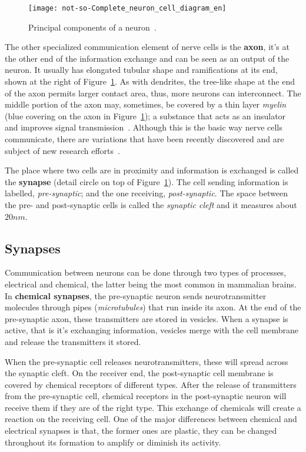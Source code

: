 \begin{figure}
  \begin{center}
    \texttt{[image: not-so-Complete\_neuron\_cell\_diagram\_en]}
    \caption{Principal components of a neuron~\cite{wikipedia-images}.}
    \label{fig:neuro:neuron-anatomy}
  \end{center}
\end{figure}

The other specialized communication element of nerve cells is the \textbf{axon}, it's at the other end of the information exchange and can be seen as an output of the neuron. It usually has elongated tubular shape and ramifications at its end, shown at the right of Figure~\ref{fig:neuro:neuron-anatomy}. As with dendrites, the tree-like shape at the end of the axon permits larger contact area, thus, more neurons can interconnect. The middle portion of the axon may, sometimes, be covered by a thin layer \emph{myelin} (blue covering on the axon in Figure~\ref{fig:neuro:neuron-anatomy}); a substance that acts as an insulator and improves signal transmission~\cite{thompson2000brain}. Although this is the basic way nerve cells communicate, there are variations that have been recently discovered and are subject of new research efforts~\cite{Bullock04112005}.

The place where two cells are in proximity and information is exchanged is called the \textbf{synapse} (detail circle on top of Figure~\ref{fig:neuro:neuron-anatomy}). The cell sending information is labelled, \emph{pre-synaptic}; and the one receiving, \emph{post-synaptic}. The space between the pre- and post-synaptic cells is called the \emph{synaptic cleft} and it measures about $20 nm$. 

\subsection{Synapses}

Communication between neurons can be done through two types of processes, electrical and chemical, the latter being the most common in mammalian brains. In \textbf{chemical synapses}, the pre-synaptic neuron sends neurotransmitter molecules through pipes (\emph{microtubules}) that run inside its axon. At the end of the pre-synaptic axon, these transmitters are stored in vesicles. When a synapse is active, that is it's exchanging information, vesicles merge with the cell membrane and release the transmitters it stored.

When the pre-synaptic cell releases neurotransmitters, these will spread across the synaptic cleft. On the receiver end, the post-synaptic cell membrane is covered by chemical receptors of different types. After the release of transmitters from the pre-synaptic cell, chemical receptors in the post-synaptic neuron will receive them if they are of the right type. This exchange of chemicals will create a reaction on the receiving cell. One of the major differences between chemical and electrical synapses is that, the former ones are plastic, they can be changed throughout its formation to amplify or diminish its activity.

